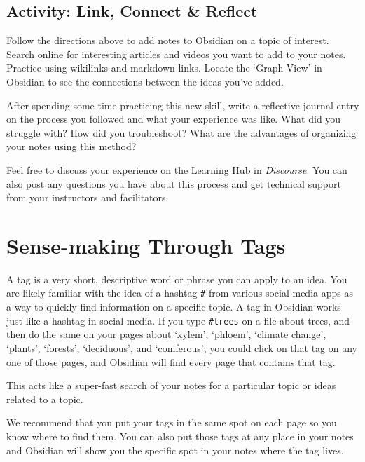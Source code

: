 \documentclass[
]{book}
\theoremstyle{definition}
\theoremstyle{definition}
\theoremstyle{definition}
\theoremstyle{definition}
\theoremstyle{remark}
\begin{document}
\hypertarget{activity-link-connect-reflect}{%
\subsection*{Activity: Link, Connect \& Reflect}\label{activity-link-connect-reflect}}

\begin{reflect}
Follow the directions above to add notes to Obsidian on a topic of interest. Search online for interesting articles and videos you want to add to your notes. Practice using wikilinks and markdown links. Locate the `Graph View' in Obsidian to see the connections between the ideas you've added.

After spending some time practicing this new skill, write a reflective journal entry on the process you followed and what your experience was like. What did you struggle with? How did you troubleshoot? What are the advantages of organizing your notes using this method?

Feel free to discuss your experience on \href{https://twu.discourse.group}{the Learning Hub} in \emph{Discourse}. You can also post any questions you have about this process and get technical support from your instructors and facilitators.
\end{reflect}

\hypertarget{sense-making-through-tags}{%
\section{Sense-making Through Tags}\label{sense-making-through-tags}}

A tag is a very short, descriptive word or phrase you can apply to an idea. You are likely familiar with the idea of a hashtag \texttt{\#} from various social media apps as a way to quickly find information on a specific topic. A tag in Obsidian works just like a hashtag in social media. If you type \texttt{\#trees} on a file about trees, and then do the same on your pages about `xylem', `phloem', `climate change', `plants', `forests', `deciduous', and `coniferous', you could click on that tag on any one of those pages, and Obsidian will find every page that contains that tag.

This acts like a super-fast search of your notes for a particular topic or ideas related to a topic.

We recommend that you put your tags in the same spot on each page so you know where to find them. You can also put those tags at any place in your notes and Obsidian will show you the specific spot in your notes where the tag lives.
\end{document}
